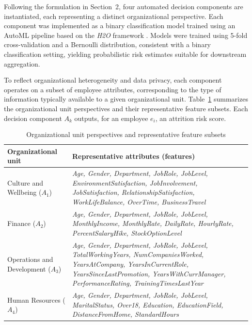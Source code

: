 \documentclass[runningheads]{llncs}
\begin{document}
Following the formulation in Section~2, four automated decision components are instantiated, each representing a distinct organizational perspective.
Each component was implemented as a binary classification model trained using an AutoML pipeline based on the \textit{H2O} framework \cite{ref_h2o2026}. Models were trained using 5-fold cross-validation and a Bernoulli distribution, consistent with a binary classification setting, yielding probabilistic risk estimates suitable for downstream aggregation.

To reflect organizational heterogeneity and data privacy, each component operates on a subset of employee attributes, corresponding to the type of information typically available to a given organizational unit.
Table~\ref{tab:departments} summarizes the organizational unit perspectives and their representative feature subsets. Each decision component $A_k$ outputs, for an employee $e_i$, an attrition risk score.

\begin{table}[t]
\centering
\setlength{\tabcolsep}{6pt}
\caption{Organizational unit perspectives and representative feature subsets} 
\label{tab:departments}
\renewcommand{\arraystretch}{1.3}
\begin{tabular}{p{2.4cm}|p{9cm}}
\hline
\textbf{Organizational unit} & \textbf{Representative attributes (features)} \\
\hline
Culture and Wellbeing ($A_{1}$) &
\textit{Age, Gender, Department, JobRole, JobLevel, EnvironmentSatisfaction, JobInvolvement, JobSatisfaction, RelationshipSatisfaction, WorkLifeBalance, OverTime, BusinessTravel} \\
\hline
Finance ($A_{2}$) &
\textit{Age, Gender, Department, JobRole, JobLevel, MonthlyIncome, MonthlyRate, DailyRate, HourlyRate, PercentSalaryHike, StockOptionLevel} \\
\hline
Operations and Development ($A_{3}$) &
\textit{Age, Gender, Department, JobRole, JobLevel, TotalWorkingYears, NumCompaniesWorked, YearsAtCompany, YearsInCurrentRole, YearsSinceLastPromotion, YearsWithCurrManager, PerformanceRating, TrainingTimesLastYear} \\
\hline
Human Resources ($A_{4}$) &
\textit{Age, Gender, Department, JobRole, JobLevel, MaritalStatus, Over18, Education, EducationField, DistanceFromHome, StandardHours} \\
\hline
\end{tabular}
\end{table}
\end{document}

